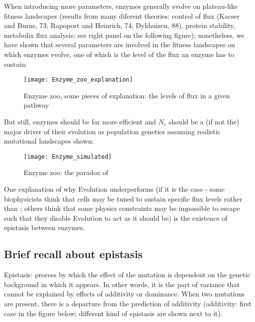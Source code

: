 \documentclass[]{article}
\begin{document}
\newpage

When introducing more parameters, enzymes generally evolve on
plateau-like fitness landscapes (results from many diferent theories:
control of flux (Kacser and Burns, 73; Rapoport and Heinrich, 74;
Dykhuizen, 88), protein stability, metabolix flux analysis; see right
panel on the following figure); nonetheless, we have shown that several
parameters are involved in the fitness landscapes on which enzymes
evolve, one of which is the level of the flux an enzyme has to sustain:

\begin{figure}

{\centering \texttt{[image: Enzyme\_zoo\_explanation]} 

}

\caption{Enzyme zoo, some pieces of explanation: the levels of flux in a given pathway}\label{fig:enzooexplain}
\end{figure}

But still, enzymes should be far more efficient and \(N_e\) should be a
(if not the) major driver of their evolution as population genetics
assuming realistic mutational landscapes shown:

\begin{figure}

{\centering \texttt{[image: Enzyme\_simulated]} 

}

\caption{Enzyme zoo: the paradox of }\label{fig:enzsim}
\end{figure}

One explanation of why Evolution underperforms (if it is the case - some
biophysicists think that cells may be tuned to sustain specific flux
levels rather than ; others think that some physics constraints may be
impossible to escape such that they disable Evolution to act as it
should be) is the existence of epistasis between enzymes.

\newpage

\hypertarget{brief-recall-about-epistasis}{%
\subsection{Brief recall about
epistasis}\label{brief-recall-about-epistasis}}

Epistasis: process by which the effect of the mutation is dependent on
the genetic background in which it appears. In other words, it is the
part of variance that cannot be explained by effects of additivity or
dominance. When two mutations are present, there is a departure from the
prediction of additivity (additivity: first case in the figure below;
different kind of epistasis are shown next to it).
\end{document}

